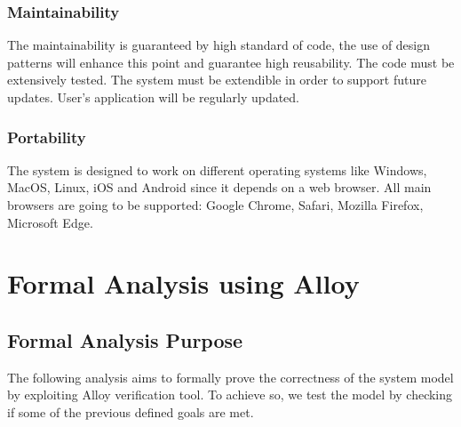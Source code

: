 \documentclass[table, 12pt]{article}
\begin{document}
\subsubsection{Maintainability}
The maintainability is guaranteed by high standard of code, the use of design patterns will enhance this point and guarantee high reusability.
The code must be extensively tested.
The system must be extendible in order to support future updates.
User's application will be regularly updated.
\subsubsection{Portability}
The system is designed to work on different operating systems like Windows, MacOS, Linux, iOS and Android since it depends on a web browser.
All main browsers are going to be supported: Google Chrome, Safari, Mozilla Firefox, Microsoft Edge.
\newpage
\section{Formal Analysis using Alloy}
\subsection{Formal Analysis Purpose}
The following analysis aims to formally prove the correctness of the system model by exploiting Alloy verification tool. To achieve so, we test the model by checking if some of the previous defined goals are met. 
\end{document}
